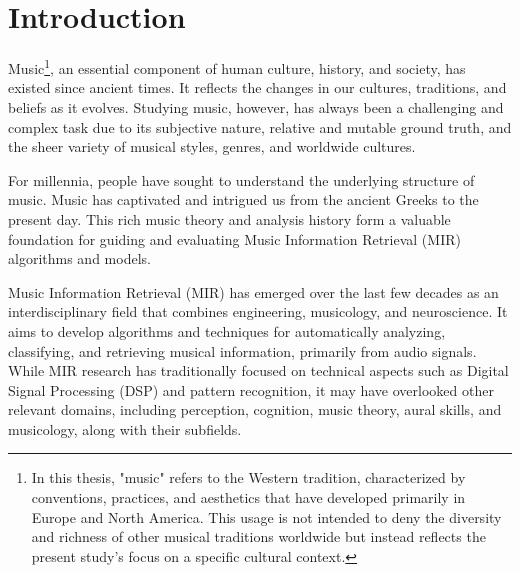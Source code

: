 \chapter{Introduction}

Music\footnote{In this thesis, "music" refers to the Western tradition, characterized by conventions, practices, and aesthetics that have developed primarily in Europe and North America. This usage is not intended to deny the diversity and richness of other musical traditions worldwide but instead reflects the present study's focus on a specific cultural context.}, an essential component of human culture, history, and society, has existed since ancient times. It reflects the changes in our cultures, traditions, and beliefs as it evolves. Studying music, however, has always been a challenging and complex task due to its subjective nature, relative and mutable ground truth, and the sheer variety of musical styles, genres, and worldwide cultures.

For millennia, people have sought to understand the underlying structure of music. Music has captivated and intrigued us from the ancient Greeks to the present day. This rich music theory and analysis history form a valuable foundation for guiding and evaluating Music Information Retrieval (MIR) algorithms and models.

Music Information Retrieval (MIR) has emerged over the last few decades as an interdisciplinary field that combines engineering, musicology, and neuroscience. It aims to develop algorithms and techniques for automatically analyzing, classifying, and retrieving musical information, primarily from audio signals. While MIR research has traditionally focused on technical aspects such as Digital Signal Processing (DSP) and pattern recognition, it may have overlooked other relevant domains, including perception, cognition, music theory, aural skills, and musicology, along with their subfields.